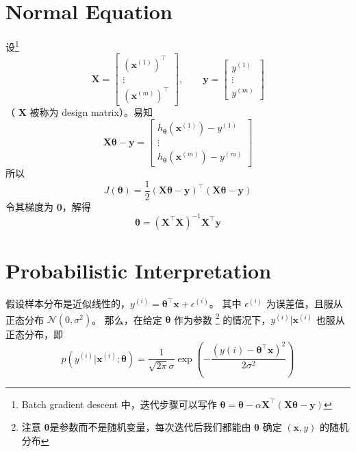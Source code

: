 	\section{Normal Equation}
		设\footnote{Batch gradient descent 中，迭代步骤可以写作 $ \bm{\theta} = \bm{\theta} - \alpha \bm{X}^\intercal (\bm{X\theta} - \bm{y}) $}
		\begin{equation*}
			\bm{X} = 
			\begin{bmatrix}
				(\bm{x}^{(1)})^\intercal \\
				\vdots \\
				(\bm{x}^{(m)})^\intercal
			\end{bmatrix}
			, \qquad \bm{y} = 
			\begin{bmatrix}
				y^{(1)} \\
				\vdots \\
				y^{(m)}
			\end{bmatrix}
		\end{equation*}
		（ $ \bm{X} $ 被称为 design matrix）。易知 
		\begin{equation}
			\bm{X} \bm{\theta} - \bm{y} = 
			\begin{bmatrix}
				h_{\bm{\theta}} (\bm{x}^{(1)}) - y^{(1)} \\
				\vdots \\
				h_{\bm{\theta}} (\bm{x}^{(m)}) - y^{(m)} 
			\end{bmatrix}
		\end{equation}
		所以 
		\begin{equation}
			J(\bm{\theta}) = \frac{1}{2} \left( \bm{X} \bm{\theta} - \bm{y} \right)^\intercal \left( \bm{X}\bm{\theta} - \bm{y} \right)
		\end{equation}
		令其梯度为 $ \bm{0} $，解得 
		\begin{equation}
			\bm{\theta} = \left( \bm{X}^\intercal \bm{X} \right) ^{-1} \bm{X}^\intercal \bm{y}
		\end{equation}
		
	\section{Probabilistic Interpretation}
		假设样本分布是近似线性的，$ y^{(i)} = \bm{\theta}^\intercal \bm{x} + \epsilon^{(i)} $。
		其中 $ \epsilon^{(i)} $ 为误差值，且服从正态分布 $ \mathcal{N}(0, \sigma^2) $。
		那么，在给定 $ \bm{\theta} $ 作为参数 
		\footnote{注意 $ \bm{\theta} $是参数而不是随机变量，每次迭代后我们都能由 $ \bm{\theta} $ 确定 $ (\bm{x}, y) $ 的随机分布} 
		的情况下，$ y^{(i)} | \bm{x}^{(i)} $ 也服从正态分布，即
		\begin{equation}
			p(y^{(i)} | \bm{x}^{(i)}; \bm{\theta}) = \frac{1}{\sqrt{2\pi}\sigma} \exp \left( - \frac{(y{(i)} - \bm{\theta}^\intercal 
				\bm{x})^2}{2\sigma^2} \right)
		\end{equation}
		

